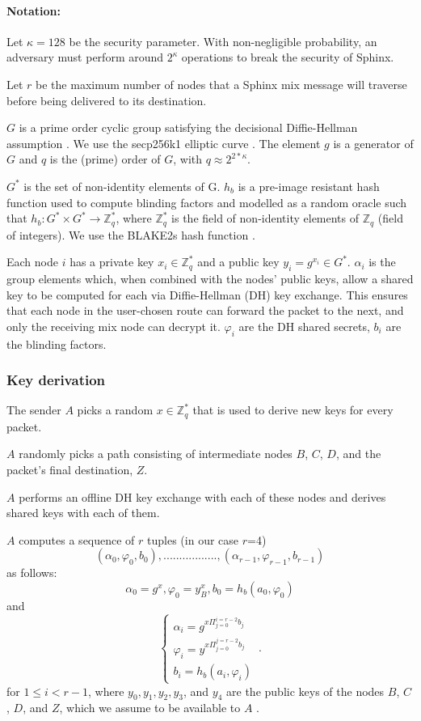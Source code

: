 \paragraph{Notation:}Let $\kappa=128$ be the security parameter. With non-negligible probability, an adversary must perform around $2^\kappa$ operations to break the security of Sphinx.

Let $r$ be the maximum number of nodes that a Sphinx mix message will traverse before being delivered to its destination.

$G$ is a prime order cyclic group satisfying the decisional Diffie-Hellman assumption \cite{Boneh_1998}. We use the secp256k1 elliptic curve \cite{sec2}. The element $g$ is a generator of $G$ and $q$ is the (prime) order of $G$, with $q\approx2^{2*\kappa}$.

$G^*$ is the set of non-identity elements of G. $h_b$ is a pre-image resistant hash function used to compute blinding factors and modelled as a random oracle such that
$h_b:G^*\times G^*\rightarrow\mathbb{Z}^*_q$, where $\mathbb{Z}^*_q$ is the field of non-identity elements of $\mathbb{Z}_q$ (field of integers). We use the BLAKE2s hash function \cite{blake2}.

Each node $i$ has a private key $x_{i}\in \mathbb{Z}^*_q$ and a public key $y_{i}=g^{x_{i}}\in G^*$.
$\alpha_i$ is the group elements which, when combined with the nodes’ public keys, allow a shared key to be computed for each via Diffie-Hellman (DH) key exchange. This ensures that each node in the user-chosen route can forward the packet to the next, and only the receiving mix node can decrypt it.
$\varphi_i$ are the DH shared secrets, $b_i$ are the blinding factors.

\subsubsection{Key derivation}
The sender $A$ picks a random $x\in \mathbb{Z}^*_q$ that is used to derive new keys for every packet.

$A$ randomly picks a path consisting of intermediate nodes $B$, $C$, $D$, and the packet's final destination, $Z$.

$A$ performs an offline DH key exchange with each of these nodes and derives shared keys with each of them.

$A$ computes a sequence of $r$ tuples (in our case $r$=4)  $$(\alpha_0,\varphi_0,b_0),.................,(\alpha_{r-1},\varphi_{r-1},b_{r-1})$$ as follows:
$$\alpha_0=g^x,\varphi_0=y^x_B,b_0=h_b(a_0,\varphi_0)$$
and
\begin{equation}
    \begin{cases}
        \alpha_i=g^{x\Pi_{j=0}^{i=r-2}b_j}\\
        \varphi_i=y^{x\Pi_{j=0}^{j=r-2}b_j} \\
        b_i=h_b(a_i,\varphi_i)
    \end{cases}\,.
    \label{eq:1}
\end{equation}
for $1\le i < r-1$, where $y_0,y_1, y_2, y_3$, and $y_4$ are the public keys of the nodes $B$, $C$, $D$, and $Z$, which we assume to be available to $A$ .

